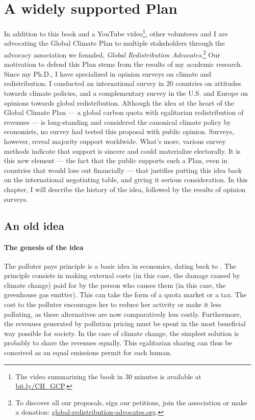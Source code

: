 \documentclass[a5paper,english,openany]{memoir}
\begin{document}
\chapter{A widely supported Plan\label{ch:soutien}}

In addition to this book and a YouTube video\footnote{The video summarizing the book in 30 minutes is available at \href{https://bit.ly/CH_GCP}{bit.ly/CH\_GCP}.}, other volunteers and I are advocating the Global Climate Plan to multiple stakeholders through the advocacy association we founded, \textit{Global Redistribution Advocates}.\footnote{To discover all our proposals, sign our petitions, join the association or make a donation: \href{http://global-redistribution-advocates.org/}{global-redistribution-advocates.org}.} %
Our motivation to defend this Plan stems from the results of my academic research. Since my Ph.D., I have specialized in opinion surveys on climate and redistribution. I conducted an international survey in 20 countries on attitudes towards climate policies, and a complementary survey in the U.S. and Europe on opinions towards global redistribution. Although the idea at the heart of the Global Climate Plan --- a global carbon quota with egalitarian redistribution of revenues --- is long-standing and considered the canonical climate policy by economists, no survey had tested this proposal with public opinion. Surveys, however, reveal majority support worldwide. What's more, various survey methods indicate that support is sincere and could materialize electorally. 
It is this new element --- the fact that the public supports such a Plan, even in countries that would lose out financially --- that justifies putting this idea back on the international negotiating table, and giving it serious consideration. In this chapter, I will describe the history of the idea, followed by the results of opinion surveys.


\section{An old idea} 

\subsubsection{The genesis of the idea}
The polluter pays principle is a basic idea in economics, dating back to \citet{pigou_economics_1920}. The principle consists in making external costs (in this case, the damage caused by climate change) paid for by the person who causes them (in this case, the greenhouse gas emitter). This can take the form of a quota market or a tax. The cost to the polluter encourages her to reduce her activity or make it less polluting, as these alternatives are now comparatively less costly. %
Furthermore, the revenues generated by pollution pricing must be spent in the most beneficial way possible for society.  
In the case of climate change, the simplest solution is probably to share the revenues equally. This egalitarian sharing can thus be conceived as an equal emissions permit for each human. 
\end{document}
